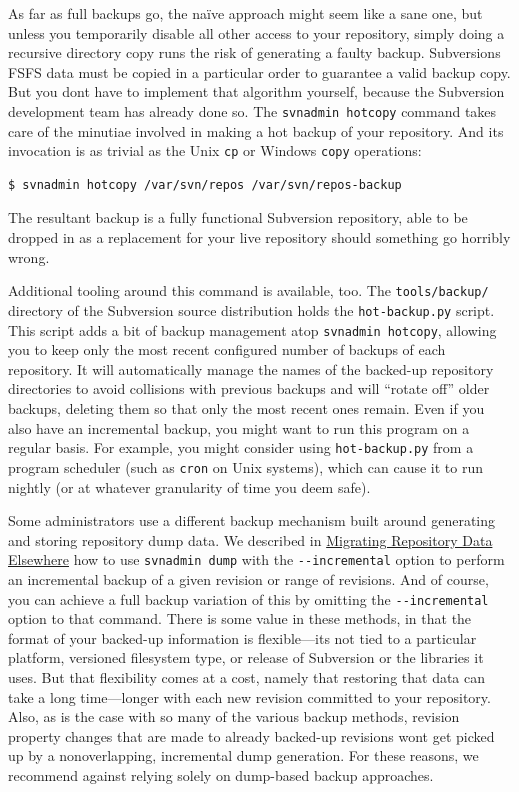 As far as full backups go, the naïve approach might seem like a sane
one, but unless you temporarily disable all other access to your
repository, simply doing a recursive directory copy runs the risk of
generating a faulty backup. Subversion\textquotesingle s FSFS data must
be copied in a particular order to guarantee a valid backup copy. But
you don\textquotesingle t have to implement that algorithm yourself,
because the Subversion development team has already done so. The \texttt{svnadmin\ hotcopy} command takes care of
the minutiae involved in making a hot backup of your repository. And its
invocation is as trivial as the Unix \texttt{cp} or Windows
\texttt{copy} operations:

\begin{verbatim}
$ svnadmin hotcopy /var/svn/repos /var/svn/repos-backup
\end{verbatim}

The resultant backup is a fully functional Subversion repository, able
to be dropped in as a replacement for your live repository should
something go horribly wrong.

Additional tooling around this command is available, too. The
\texttt{tools/backup/} directory of the Subversion source distribution
holds the \texttt{hot-backup.py} script. This script adds a bit of
backup management atop \texttt{svnadmin\ hotcopy}, allowing you to keep
only the most recent configured number of backups of each repository. It
will automatically manage the names of the backed-up repository
directories to avoid collisions with previous backups and will ``rotate
off'' older backups, deleting them so that only the most recent ones
remain. Even if you also have an incremental backup, you might want to
run this program on a regular basis. For example, you might consider
using \texttt{hot-backup.py} from a program scheduler (such as
\texttt{cron} on Unix systems), which can cause it to run nightly (or at
whatever granularity of time you deem safe).

Some administrators use a different backup mechanism built around
generating and storing repository dump data. We described in
\hyperref[svn.reposadmin.maint.migrate]{Migrating Repository Data
Elsewhere} how to use \texttt{svnadmin\ dump} with the
\texttt{-\/-incremental} option to perform an incremental backup of a
given revision or range of revisions. And of course, you can achieve a
full backup variation of this by omitting the \texttt{-\/-incremental}
option to that command. There is some value in these methods, in that
the format of your backed-up information is
flexible---it\textquotesingle s not tied to a particular platform,
versioned filesystem type, or release of Subversion or the libraries it
uses. But that flexibility comes at a cost, namely that restoring that
data can take a long time---longer with each new revision committed to
your repository. Also, as is the case with so many of the various backup
methods, revision property changes that are made to already backed-up
revisions won\textquotesingle t get picked up by a nonoverlapping,
incremental dump generation. For these reasons, we recommend against
relying solely on dump-based backup approaches.

